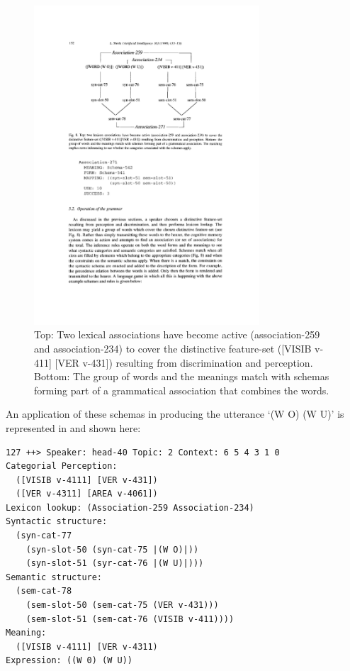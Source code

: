 \begin{figure}[t]
\centerline{
\includegraphics[width=0.75\textwidth]{chap10/figs/associations.pdf}}
\caption{\label{fig:associations}Top: Two lexical associations have become active (association-259 and association-234) to cover the distinctive 
feature-set ([VISIB v-411] [VER v-431]) resulting from discrimination and perception. Bottom: 
The group of words and the meanings match with schemas forming part of a grammatical association that combines the words. }
\end{figure}
An application of these schemas in producing the utterance `(W O) (W U)' is represented in  and shown 
here: 
\begin{verbatim}
127 ++> Speaker: head-40 Topic: 2 Context: 6 5 4 3 1 0
Categorial Perception:
  ([VISIB v-4111] [VER v-431])
  ([VER v-4311] [AREA v-4061])
Lexicon lookup: (Association-259 Association-234)
Syntactic structure:
  (syn-cat-77
    (syn-slot-50 (syn-cat-75 |(W O)|))
    (syn-slot-51 (syr-cat-76 |(W U)|)))
Semantic structure:
  (sem-cat-78
    (sem-slot-50 (sem-cat-75 (VER v-431)))
    (sem-slot-51 (sem-cat-76 (VISIB v-411))))
Meaning:
  ([VISIB v-4111] [VER v-4311)
Expression: ((W 0) (W U))
\end{verbatim}

